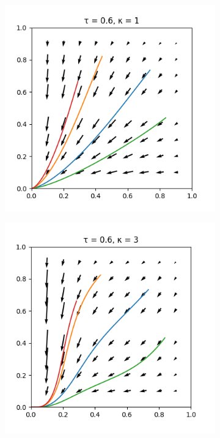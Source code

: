 \documentclass[10pt,a4paper]{article}
\begin{document}
\begin{figure}[h]
    \centering
    \begin{subfigure}[b]{0.30\textwidth}
        \includegraphics[width=\textwidth]{Figures/boltzmann_pd_1.png}
    \end{subfigure}
    \begin{subfigure}[b]{0.30\textwidth}
        \includegraphics[width=\textwidth]{Figures/boltzmann_pd_3.png}

\end{subfigure}
\end{figure}
\end{document}
